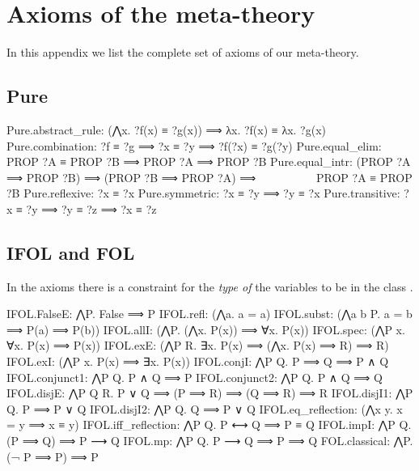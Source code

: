 \section{Axioms of the meta-theory}
\label{appendix:axioms}

In this appendix we list the complete set of axioms of our meta-theory.

\subsection{Pure}
\begin{isabelle}
Pure.abstract\_rule: (⋀x. ?f(x) ≡ ?g(x)) ⟹ λx. ?f(x) ≡ λx. ?g(x)\isanewline
Pure.combination: ?f ≡ ?g ⟹ ?x ≡ ?y ⟹ ?f(?x) ≡ ?g(?y)\isanewline
Pure.equal\_elim: PROP ?A ≡ PROP ?B ⟹ PROP ?A ⟹ PROP ?B\isanewline
Pure.equal\_intr: (PROP ?A ⟹ PROP ?B) ⟹ (PROP ?B ⟹ PROP ?A) ⟹ \isanewline
\ \ \ \ \ \ \ \ \ \ PROP ?A ≡ PROP ?B\isanewline
Pure.reflexive: ?x ≡ ?x\isanewline
Pure.symmetric: ?x ≡ ?y ⟹ ?y ≡ ?x\isanewline
Pure.transitive: ?x ≡ ?y ⟹ ?y ≡ ?z ⟹ ?x ≡ ?z
\end{isabelle}

\subsection{IFOL and FOL}
In the axioms  there is a constraint
for the \emph{type of} the variables  to be in the class .
\begin{isabelle}
IFOL.FalseE: ⋀P. False ⟹ P\isanewline
IFOL.refl:  (⋀a. a = a)\isanewline
IFOL.subst: (⋀a b P. a = b ⟹ P(a) ⟹ P(b))\isanewline
IFOL.allI:  (⋀P. (⋀x. P(x)) ⟹ ∀x. P(x))\isanewline
IFOL.spec:  (⋀P x. ∀x. P(x) ⟹ P(x))\isanewline
IFOL.exE:   (⋀P R. ∃x. P(x) ⟹ (⋀x. P(x) ⟹ R) ⟹ R)\isanewline
IFOL.exI:   (⋀P x. P(x) ⟹ ∃x. P(x))\isanewline
IFOL.conjI: ⋀P Q. P ⟹ Q ⟹ P ∧ Q\isanewline
IFOL.conjunct1: ⋀P Q. P ∧ Q ⟹ P\isanewline
IFOL.conjunct2: ⋀P Q. P ∧ Q ⟹ Q\isanewline
IFOL.disjE: ⋀P Q R. P ∨ Q ⟹ (P ⟹ R) ⟹ (Q ⟹ R) ⟹ R\isanewline
IFOL.disjI1: ⋀P Q. P ⟹ P ∨ Q\isanewline
IFOL.disjI2: ⋀P Q. Q ⟹ P ∨ Q\isanewline
IFOL.eq\_reflection: (⋀x y. x = y ⟹ x ≡ y)\isanewline
IFOL.iff\_reflection: ⋀P Q. P ⟷ Q ⟹ P ≡ Q\isanewline
IFOL.impI: ⋀P Q. (P ⟹ Q) ⟹ P ⟶ Q\isanewline
IFOL.mp: ⋀P Q. P ⟶ Q ⟹ P ⟹ Q\isanewline%
FOL.classical: ⋀P. (¬ P ⟹ P) ⟹ P
\end{isabelle}


